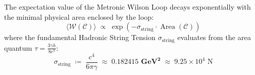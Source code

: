 \documentclass[
    12pt,
    a4paper,
    headings=normal,
    twoside=false,
    open=any,
    parskip=half
]{scrbook}
\begin{document}
\begin{phystheorem}\label{thm:ch8_metronic_area_law_confinement}
The expectation value of the Metronic Wilson Loop decays exponentially with the minimal physical area enclosed by the loop:
\begin{equation}
\langle \mathcal{W}(\mathcal{C}) \rangle \;\propto\; \exp\left( -\sigma_{\text{string}} \cdot \operatorname{Area}(\mathcal{C}) \right)
\label{eq:ch8_area_law_decay}
\end{equation}
where the fundamental Hadronic String Tension $\sigma_{\text{string}}$ evaluates from the area quantum $\tau = \frac{3\gamma h}{8c^3}$:
\begin{equation}
\boxed{\sigma_{\text{string}} \;\coloneqq\; \frac{c^4}{6\pi \gamma} \;\approx\; \mathbf{0.182415 \text{ GeV}^2} \;\approx\; 9.25 \times 10^4 \text{ N}}
\label{eq:ch8_string_tension_master}
\end{equation}
\end{phystheorem}
\end{document}
